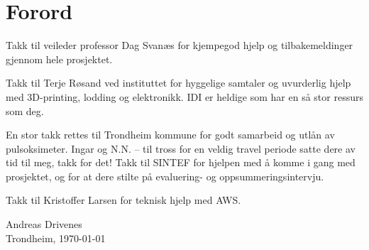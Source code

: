 \chapter*{Forord}
Takk til veileder professor Dag Svanæs for kjempegod hjelp og tilbakemeldinger gjennom hele prosjektet.

Takk til Terje Røsand ved instituttet for hyggelige samtaler og uvurderlig hjelp med 3D-printing, lodding og elektronikk.
IDI er heldige som har en så stor ressurs som deg.

En stor takk rettes til Trondheim kommune for godt samarbeid og utlån av pulsoksimeter.
Ingar og N.N. -- til tross for en veldig travel periode satte dere av tid til meg, takk for det!
Takk til SINTEF for hjelpen med å komme i gang med prosjektet, og for at dere
stilte på evaluering- og oppsummeringsintervju.

Takk til Kristoffer Larsen for teknisk hjelp med AWS.

\begin{flushright}
Andreas Drivenes\\[0.8pc]
Trondheim, \today
\end{flushright}
